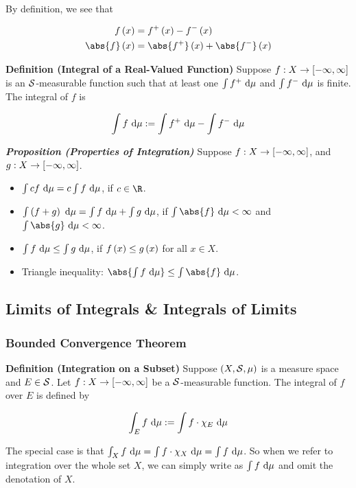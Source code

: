 \documentclass[
]{article}
\begin{document}
By definition, we see that

\[\ba
f\pr{x} & = f^+\pr{x}-f^-\pr{x}\\
\abs{f}\pr{x} & = \abs{f^+}\pr{x}+\abs{f^-}\pr{x}
\ea\]

\textbf{Definition (Integral of a Real-Valued Function)} Suppose
\(f:X\to \br{-\infty,\infty}\) is an \(\S\)-measurable function such
that at least one \(\int f^+\dm\) and \(\int f^-\dm\) is finite. The
integral of \(f\) is

\[\int f\dm := \int f^+\dm -\int f^-\dm\]

\emph{\textbf{Proposition (Properties of Integration)}} Suppose
\(f:X\to \br{-\infty,\infty}\), and \(g:X\to \br{-\infty,\infty}\).

\begin{itemize}
\item
  \(\int cf\dm = c\int f\dm\), if \(c\in \R\).
\item
  \(\int\pr{f+g}\dm = \int f\dm + \int g\dm\), if
  \(\int \abs{f}\dm<\infty\) and \(\int \abs{g}\dm<\infty\).
\item
  \(\int f\dm \le \int g\dm\), if \(f\pr{x}\le g\pr x\) for all
  \(x\in X\).
\item
  Triangle inequality: \(\abs{\int f\dm}\le \int \abs{f}\dm\).
\end{itemize}

\hypertarget{limits-of-integrals--integrals-of-limits}{%
\subsection{Limits of Integrals \& Integrals of
Limits}\label{limits-of-integrals--integrals-of-limits}}

\hypertarget{bounded-convergence-theorem}{%
\subsubsection{Bounded Convergence
Theorem}\label{bounded-convergence-theorem}}

\textbf{Definition (Integration on a Subset)} Suppose \(\pr{X,\S,\mu}\)
is a measure space and \(E\in \S\). Let \(f:X\to \br{-\infty,\infty}\)
be a \(\S\)-measurable function. The integral of \(f\) over \(E\) is
defined by

\[\int_Ef\dm:=\int f\cdot\chi_E\dm\]

The special case is that
\(\int_Xf\dm = \int f\cdot \chi_X\dm = \int f\dm\). So when we refer to
integration over the whole set \(X\), we can simply write as
\(\int f\dm\) and omit the denotation of \(X\).
\end{document}
